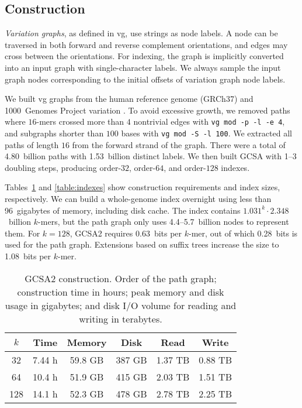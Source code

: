 \documentclass[twoside,leqno,twocolumn]{article}
\newcommand{\kmer}[1]{$#1$\nobreakdash-mer}
\newcommand{\orderk}[1]{order\nobreakdash-$#1$}
\begin{document}
\subsection{Construction}

\emph{Variation graphs}, as defined in vg, use strings as node labels. A node can be traversed in both forward and reverse complement orientations, and edges may cross between the orientations. For indexing, the graph is implicitly converted into an input graph with single-character labels. We always sample the input graph nodes corresponding to the initial offsets of variation graph node labels.

We built vg graphs from the human reference genome (GRCh37) and 1000~Genomes Project variation \cite{1000GP2015}. To avoid excessive growth, we removed paths where \kmer{16}s crossed more than $4$ nontrivial edges with \texttt{vg mod -p -l -e 4}, and subgraphs shorter than $100$ bases with \texttt{vg mod -S -l 100}. We extracted all paths of length $16$ from the forward strand of the graph. There were a total of 4.80~billion paths with 1.53~billion distinct labels. We then built GCSA with 1\nobreakdash--3 doubling steps, producing \orderk{32}, \orderk{64}, and \orderk{128} indexes.

Tables~\ref{table:construction} and \ref{table:indexes} show construction requirements and index sizes, respectively. We can build a whole-genome index overnight using less than 96~gigabytes of memory, including disk cache. The index contains $1.031^{k} \cdot 2.348$~billion \kmer{k}s, but the path graph only uses 4.4\nobreakdash--5.7~billion nodes to represent them. For $k = 128$, GCSA2 requires 0.63~bits per \kmer{k}, out of which 0.28~bits is used for the path graph. Extensions based on suffix trees increase the size to 1.08~bits per \kmer{k}.

\begin{table}
\begin{center}
\begin{tabular}{c|ccc|cc}
\hline
$k$ & \textbf{Time} & \textbf{Memory} & \textbf{Disk} & \textbf{Read} & \textbf{Write} \\
\hline
 32 & 7.44 h & 59.8 GB & 387 GB & 1.37 TB & 0.88 TB \\
 64 & 10.4 h & 51.9 GB & 415 GB & 2.03 TB & 1.51 TB \\
128 & 14.1 h & 52.3 GB & 478 GB & 2.78 TB & 2.25 TB \\
\hline
\end{tabular}
\caption{GCSA2 construction. Order of the path graph; construction time in hours; peak memory and disk usage in gigabytes; and disk I/O volume for reading and writing in terabytes.}\label{table:construction}
\end{center}
\end{table}
\end{document}
